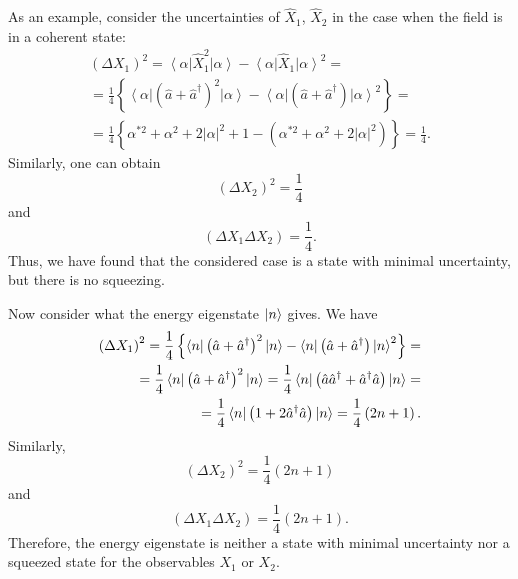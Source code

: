 As an example, consider the uncertainties of $\hat{X}_1$, 
$\hat{X}_2$ in the case when the field is in a coherent state:
\begin{eqnarray}
\left(\Delta X_1\right)^2 = 
\left<\alpha\right|\hat{X}_1^2\left|\alpha\right> - 
\left<\alpha\right|\hat{X}_1\left|\alpha\right>^2 = 
\nonumber \\
=\frac{1}{4}
\left\{
\left<\alpha\right|\left(\hat{a} +
\hat{a}^{\dag}\right)^2\left|\alpha\right> -  
\left<\alpha\right|\left(\hat{a} +
\hat{a}^{\dag}\right)\left|\alpha\right>^2 
\right\} = 
\nonumber \\
=\frac{1}{4}
\left\{
\alpha^{*2} + \alpha^2 + 2 \left|\alpha\right|^2 + 1 - 
\left(\alpha^{*2} + \alpha^2 + 2 \left|\alpha\right|^2\right)
\right\} 
=\frac{1}{4}.
\nonumber
\end{eqnarray}
Similarly, one can obtain
\begin{equation}
\left(\Delta X_2\right)^2 = \frac{1}{4}
\label{eqPart3SqueezedTaskX2Alpha_1}
\end{equation}
and
\begin{equation}
\left(\Delta X_1 \Delta X_2\right) = \frac{1}{4}.
\label{eqPart3SqueezedTaskX2Alpha_2}
\end{equation}
Thus, we have found that the considered case is
a state with minimal uncertainty, but there is no squeezing.

Now consider what the energy eigenstate
$\ket{n}$ gives. We have
\begin{eqnarray}
\left(\Delta X_1\right)^2 
=\frac{1}{4}
\left\{
\bra{n}\left(\hat{a} +
\hat{a}^{\dag}\right)^2\ket{n} -  
\bra{n}\left(\hat{a} +
\hat{a}^{\dag}\right)\ket{n}^2 
\right\} = 
\nonumber \\
=
\frac{1}{4}
\bra{n}\left(\hat{a} +
\hat{a}^{\dag}\right)^2\ket{n}
=
\frac{1}{4}
\bra{n}\left(\hat{a}\hat{a}^{\dag} +
\hat{a}^{\dag}\hat{a}\right)\ket{n} =
\nonumber \\
=
\frac{1}{4}
\bra{n}\left(1 + 2
\hat{a}^{\dag}\hat{a}\right)\ket{n}
=\frac{1}{4}\left(2 n + 1\right).
\nonumber
\end{eqnarray}
Similarly,
\begin{equation}
\left(\Delta X_2\right)^2 = \frac{1}{4}\left(2 n + 1\right)
\label{eqPart3SqueezedTaskX2N_1}
\end{equation}
and
\begin{equation}
\left(\Delta X_1 \Delta X_2\right) = \frac{1}{4}\left(2 n + 1\right).
\label{eqPart3SqueezedTaskX2N_2}
\end{equation}
Therefore, the energy eigenstate is neither a state with
minimal uncertainty nor a squeezed state for the observables
$X_1$ or $X_2$.